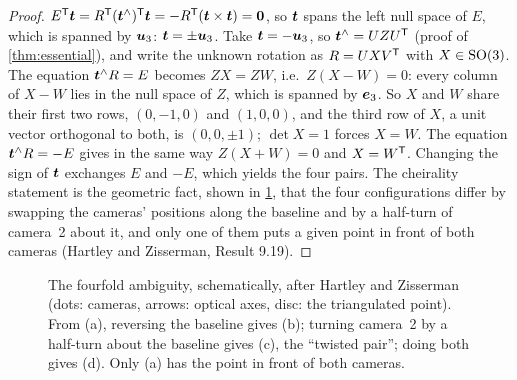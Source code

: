\begin{proof}
$E^{\mathsf{T}}\bm{t}=R^{\mathsf{T}}(\bm{t}^{\wedge})^{\mathsf{T}}\bm{t}=-R^{\mathsf{T}}(\bm{t}\times\bm{t})
=\bm{0}$, so $\bm{t}$ spans the left null space of $E$, which is
spanned by $\bm{u}_3$: $\bm{t}=\pm\bm{u}_3$. Take $\bm{t}=
-\bm{u}_3$, so $\bm{t}^{\wedge}=UZU^{\mathsf{T}}$ (proof of \cref{thm:essential}),
and write the unknown rotation as $R=UXV^{\mathsf{T}}$ with $X\in\mathrm{SO}(3)$. The
equation $\bm{t}^{\wedge}R=E$ becomes $ZX=ZW$, i.e.\ $Z(X-W)=0$: every
column of $X-W$ lies in the null space of $Z$, which is spanned by
$\bm{e}_3$. So $X$ and $W$ share their first two rows, $(0,-1,0)$ and
$(1,0,0)$, and the third row of $X$, a unit vector orthogonal to both,
is $(0,0,\pm1)$; $\det X=1$ forces $X=W$. The equation
$\bm{t}^{\wedge}R=-E$ gives in the same way $Z(X+W)=0$ and $X=W^{\mathsf{T}}$.
Changing the sign of $\bm{t}$ exchanges $E$ and $-E$, which yields the
four pairs. The cheirality statement is the geometric fact, shown in
\cref{fig:fourfold}, that the four configurations differ by swapping
the cameras' positions along the baseline and by a half-turn of camera~2
about it, and only one of them puts a given point in front of both
cameras (Hartley and Zisserman, Result 9.19).
\end{proof}

\begin{figure}[ht]
\centering
{}
\caption{The fourfold ambiguity, schematically, after Hartley and
Zisserman (dots: cameras, arrows: optical axes, disc: the triangulated
point). From (a), reversing the baseline gives (b); turning camera~2 by
a half-turn about the baseline gives (c), the ``twisted pair''; doing
both gives (d). Only (a) has the point in front of both cameras.}
\label{fig:fourfold}
\end{figure}

